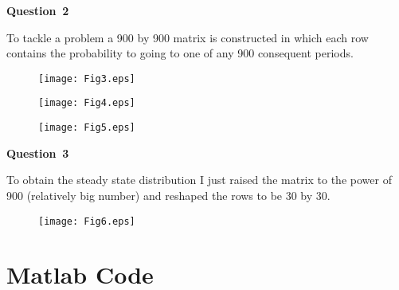 \documentclass[a4paper,12pt]{article}
\begin{document}
\newpage
\textbf{Question \textnumero \,2 }

\vspace{\baselineskip}
To tackle a problem a 900 by 900 matrix is constructed in which each row contains the probability to going to one of any 900 consequent periods.


\begin{figure}[h]
\centering
\texttt{[image: Fig3.eps]}
\end{figure}
\vspace{\baselineskip}

\begin{figure}[h]
\centering
\texttt{[image: Fig4.eps]}
\end{figure}
\vspace{\baselineskip}

\begin{figure}[h]
\centering
\texttt{[image: Fig5.eps]}
\end{figure}
\vspace{\baselineskip}
\newpage
\textbf{Question \textnumero \,3 }

\vspace{\baselineskip}
To obtain the steady state distribution I just raised the matrix to the power of 900 (relatively big number) and reshaped the rows to be 30 by 30.

\begin{figure}[h]
\centering
\texttt{[image: Fig6.eps]}
\end{figure}
\vspace{\baselineskip}
\newpage
\section*{Matlab Code} 
\newpage
\end{document}
